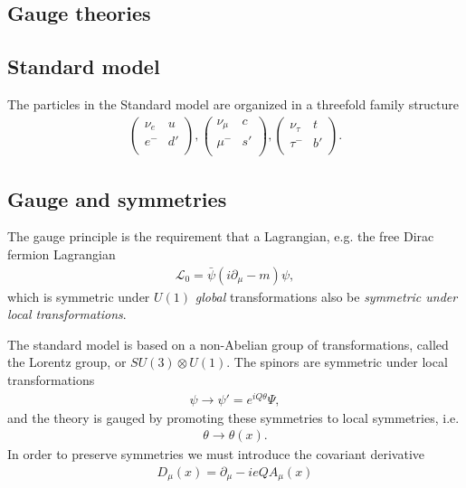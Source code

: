 \documentclass[11pt]{article}
\begin{document}
\begin{multicols}{2}
\section{Gauge theories}

\subsection*{Standard model}
\begin{flushleft}
The particles in the Standard model are organized in a threefold family structure
\begin{align*}
\begin{pmatrix}
\nu_e & u\\
e^- & d'\\
\end{pmatrix}, 
\begin{pmatrix}
\nu_{\mu} & c\\
\mu^- & s'\\
\end{pmatrix},
\begin{pmatrix}
\nu_{\tau} & t\\
\tau^- & b'\\
\end{pmatrix}.
\end{align*}
\end{flushleft}

\subsection*{Gauge and symmetries}

\begin{flushleft}
The gauge principle is the requirement that a Lagrangian, e.g. the free Dirac fermion Lagrangian
\begin{align*}
\mathcal{L}_0 = \bar{\psi}(i \partial_{\mu} - m) \psi,
\end{align*}
which is symmetric under $U(1)$ \textit{global} transformations also be \textit{symmetric under local transformations}.
\end{flushleft}

\begin{flushleft}
The standard model is based on a non-Abelian group of transformations, called the Lorentz group, or $SU(3) \otimes U(1)$. The spinors are symmetric under local transformations
\begin{align*}
\psi \rightarrow \psi'=e^{iQ\theta} \Psi,
\end{align*}
and the theory is gauged by promoting these symmetries to local symmetries, i.e.
\begin{align*}
\theta \rightarrow \theta (x).
\end{align*}
In order to preserve symmetries we must introduce the covariant derivative
\begin{align}
D_{\mu}(x) = \partial_{\mu} - ieQA_{\mu}(x)
\end{align}
\end{flushleft}


\end{multicols}
\end{document}
